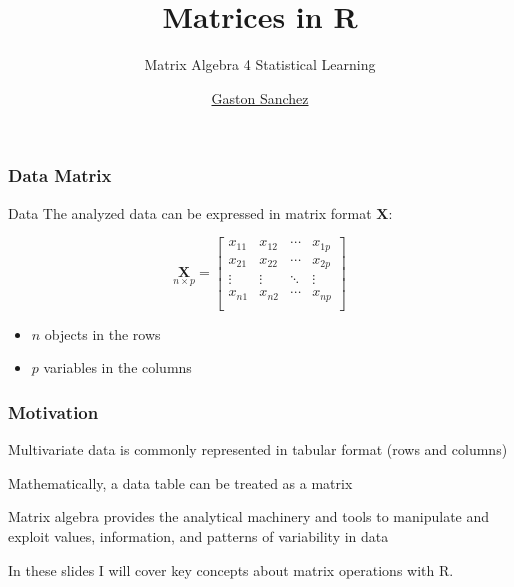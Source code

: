 \documentclass[12pt]{beamer}\usepackage[]{graphicx}\usepackage[]{color}
\title{Matrices in R}
\subtitle{Matrix Algebra 4 Statistical Learning}
\author{\href{http://www.gastonsanchez.com}{Gaston Sanchez}}
\institute{\href{https://creativecommons.org/licenses/by-sa/4.0/}{\tt \scriptsize \color{foreground} CC BY-SA 4.0}}
\date{}
\begin{document}
{
  \frame{\titlepage} 
}


\begin{frame}
\begin{center}
\Huge{}
\end{center}
\end{frame}


\begin{frame}
\frametitle{Data Matrix}

\begin{block}{Data}
The analyzed data can be expressed in matrix format $\mathbf{X}$:

\[ \underset{n \times p}{\mathbf{X}} = 
\left[\begin{array}{cccc}
x_{11} & x_{12} & \cdots & x_{1p} \\
x_{21} & x_{22} & \cdots & x_{2p} \\
\vdots & \vdots & \ddots & \vdots \\
x_{n1} & x_{n2} & \cdots & x_{np} \\
\end{array}\right]
\]
\end{block}

\begin{itemize}
 \item $n$ objects in the rows
 \item $p$ variables in the columns
\end{itemize}

\end{frame}


\begin{frame}
\frametitle{Motivation}

\bbi
  \item Multivariate data is commonly represented in tabular format (rows and columns)
  \item Mathematically, a data table can be treated as a matrix
  \item Matrix algebra provides the analytical machinery and tools to
manipulate and exploit values, information, and patterns of variability in data
\ei

{\lit In these slides I will cover key concepts about matrix operations with R.}

\end{frame}
\end{document}
